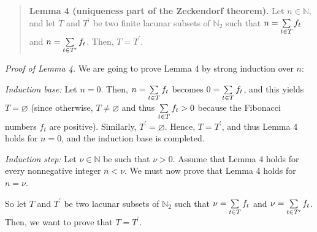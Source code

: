 \documentclass[numbers=enddot,12pt,final,onecolumn,notitlepage]{scrartcl}%
\numberwithin{exer}{section}
\theoremstyle{definition}
\let\sumnonlimits\sum
\renewcommand{\sum}{\sumnonlimits\limits}
\begin{document}
\begin{quote}
\textbf{Lemma 4 (uniqueness part of the Zeckendorf theorem).} Let
$n\in\mathbb{N}$, and let $T$ and $T^{\prime}$ be two finite lacunar subsets
of $\mathbb{N}_{2}$ such that $n=\sum\limits_{t\in T}f_{t}$ and $n=\sum
\limits_{t\in T^{\prime}}f_{t}$. Then, $T=T^{\prime}$.
\end{quote}

\textit{Proof of Lemma 4.} We are going to prove Lemma 4 by strong induction
over $n$:

\textit{Induction base:} Let $n=0$. Then, $n=\sum\limits_{t\in T}f_{t}$
becomes $0=\sum\limits_{t\in T}f_{t}$, and this yields $T=\varnothing$ (since
otherwise, $T\neq\varnothing$ and thus $\sum\limits_{t\in T}f_{t}>0$ because
the Fibonacci numbers $f_{t}$ are positive). Similarly, $T^{\prime
}=\varnothing$. Hence, $T=T^{\prime}$, and thus Lemma 4 holds for $n=0$, and
the induction base is completed.

\textit{Induction step:} Let $\nu\in\mathbb{N}$ be such that $\nu>0$. Assume
that Lemma 4 holds for every nonnegative integer $n<\nu$. We must now prove
that Lemma 4 holds for $n=\nu$.

So let $T$ and $T^{\prime}$ be two lacunar subsets of $\mathbb{N}_{2}$ such
that $\nu=\sum\limits_{t\in T}f_{t}$ and $\nu=\sum\limits_{t\in T^{\prime}%
}f_{t}$. Then, we want to prove that $T=T^{\prime}$.
\end{document}
